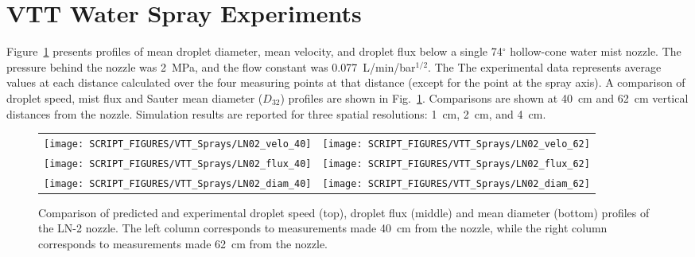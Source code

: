 \clearpage

\section{VTT Water Spray Experiments}

Figure~\ref{LN02} presents profiles of mean droplet diameter, mean velocity, and droplet flux below a single 74$^\circ$ hollow-cone water mist nozzle. The pressure behind the nozzle was 2~MPa, and the flow constant was 0.077~L/min/bar$^{1/2}$. The The experimental data represents average values at each distance calculated over the four measuring points at that distance (except for the point at the spray axis). A comparison of droplet speed, mist flux and Sauter mean diameter ($D_{32}$) profiles are shown in Fig.~\ref{LN02}. Comparisons are shown at 40~cm and 62~cm vertical distances from the nozzle. Simulation results are reported for three spatial resolutions: 1~cm, 2~cm, and 4~cm.

\begin{figure}
\begin{tabular*}{\textwidth}{l@{\extracolsep{\fill}}r}
\texttt{[image: SCRIPT\_FIGURES/VTT\_Sprays/LN02\_velo\_40]} &
\texttt{[image: SCRIPT\_FIGURES/VTT\_Sprays/LN02\_velo\_62]}  \\
\texttt{[image: SCRIPT\_FIGURES/VTT\_Sprays/LN02\_flux\_40]} &
\texttt{[image: SCRIPT\_FIGURES/VTT\_Sprays/LN02\_flux\_62]}  \\
\texttt{[image: SCRIPT\_FIGURES/VTT\_Sprays/LN02\_diam\_40]} &
\texttt{[image: SCRIPT\_FIGURES/VTT\_Sprays/LN02\_diam\_62]}  \\
\end{tabular*}
\caption[Droplet speed, flux, and mean diameter profiles of the LN-2 nozzle]{Comparison of predicted and experimental droplet speed (top), droplet flux (middle) and mean diameter (bottom) profiles of the LN-2 nozzle. The left column corresponds to measurements made 40~cm from the nozzle, while the right column corresponds to measurements made 62~cm from the nozzle.}
\label{LN02}
\end{figure}

